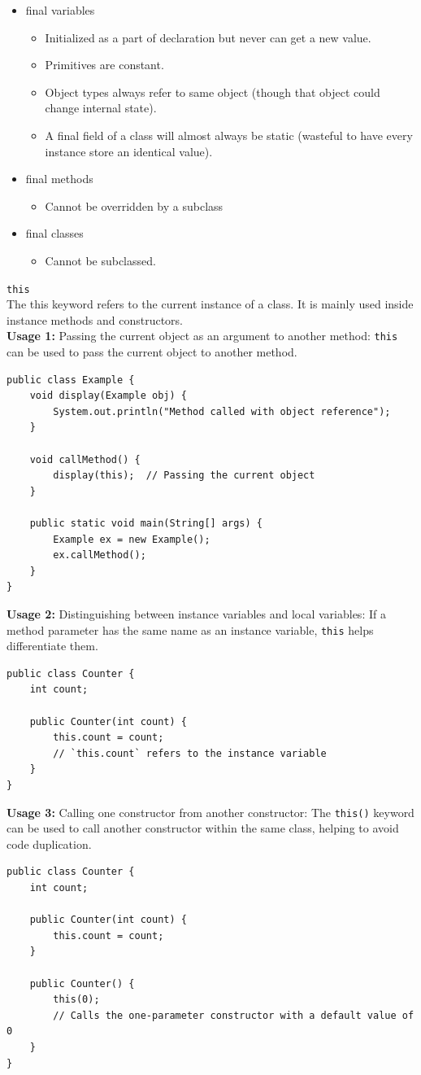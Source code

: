 \documentclass[letterpaper,12pt]{article}
\begin{document}
\begin{itemize}
    \item final variables
    \begin{itemize}
        \item Initialized as a part of declaration but never can get a new value.
        \item Primitives are constant.
        \item Object types always refer to same object (though that object could change internal state).
        \item A final field of a class will almost always be static (wasteful to have every instance store an identical value).
    \end{itemize}
    \item final methods
    \begin{itemize}
        \item Cannot be overridden by a subclass
    \end{itemize}
    \item final classes
    \begin{itemize}
        \item Cannot be subclassed.
    \end{itemize}
\end{itemize}
\texttt{this}\\
The this keyword refers to the current instance of a class. It is mainly used inside instance methods and constructors.\\
\textbf{Usage 1:} Passing the current object as an argument to another method: \texttt{this} can be used to pass the current object to another method.
\begin{verbatim}
public class Example {
    void display(Example obj) {
        System.out.println("Method called with object reference");
    }

    void callMethod() {
        display(this);  // Passing the current object
    }

    public static void main(String[] args) {
        Example ex = new Example();
        ex.callMethod();
    }
}
\end{verbatim}
\textbf{Usage 2:} Distinguishing between instance variables and local variables: If a method parameter has the same name as an instance variable, \texttt{this} helps differentiate them.
\begin{verbatim}
public class Counter {
    int count;

    public Counter(int count) {
        this.count = count;
        // `this.count` refers to the instance variable
    }
}
\end{verbatim}
\textbf{Usage 3:} Calling one constructor from another constructor: The \texttt{this()} keyword can be used to call another constructor within the same class, helping to avoid code duplication.
\begin{verbatim}
public class Counter {
    int count;

    public Counter(int count) {
        this.count = count;
    }

    public Counter() {
        this(0); 
        // Calls the one-parameter constructor with a default value of 0
    }
}
\end{verbatim}
\end{document}
